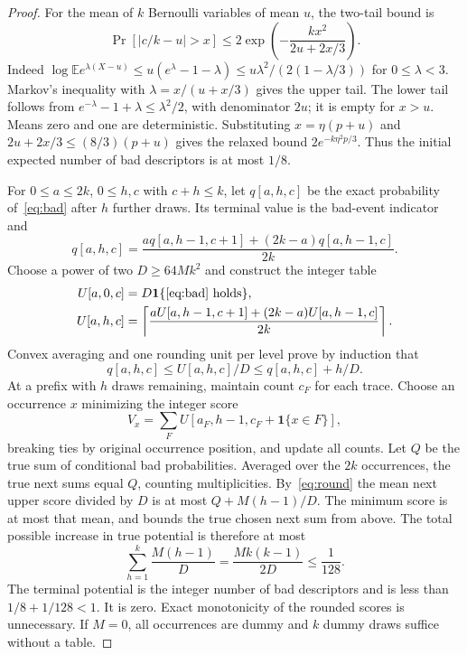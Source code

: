 \documentclass[acmsmall,11pt,nonacm,natbib=false]{acmart}
\newcommand{\ind}{\mathbf{1}}
\begin{document}
\begin{proof}
For the mean of $k$ Bernoulli variables of mean $u$, the two-tail bound is
\[
 \Pr[|c/k-u|>x]\leq2\exp\left(-\frac{kx^2}{2u+2x/3}\right).
\]
Indeed $\log\mathbb E e^{\lambda(X-u)}\leq
u(e^\lambda-1-\lambda)\leq u\lambda^2/(2(1-\lambda/3))$ for
$0\leq\lambda<3$. Markov's inequality with
$\lambda=x/(u+x/3)$ gives the upper tail. The lower tail follows from
$e^{-\lambda}-1+\lambda\leq\lambda^2/2$, with denominator $2u$;
it is empty for $x>u$. Means zero and one are deterministic. Substituting
$x=\eta(p+u)$ and $2u+2x/3\leq(8/3)(p+u)$ gives the relaxed bound
$2e^{-k\eta^2p/3}$. Thus the initial expected number of bad descriptors
is at most $1/8$.

For $0\leq a\leq2k$, $0\leq h,c$ with $c+h\leq k$, let $q[a,h,c]$
be the exact probability of~\eqref{eq:bad} after $h$ further draws.
Its terminal value is the bad-event indicator and
\[
 q[a,h,c]=\frac{a q[a,h-1,c+1]+(2k-a)q[a,h-1,c]}{2k}.
\]
Choose a power of two $D\geq64Mk^2$ and construct the integer table
\begin{align}
 U[a,0,c]&=D\ind\{\text{\eqref{eq:bad} holds}\},\nonumber\\
 U[a,h,c]&=\left\lceil
 \frac{aU[a,h-1,c+1]+(2k-a)U[a,h-1,c]}{2k}\right\rceil.\label{eq:table}
\end{align}
Convex averaging and one rounding unit per level prove by induction that
\begin{equation}\label{eq:round}
 q[a,h,c]\leq U[a,h,c]/D\leq q[a,h,c]+h/D.
\end{equation}
At a prefix with $h$ draws remaining, maintain count $c_F$ for each trace.
Choose an occurrence $x$ minimizing the integer score
\begin{equation}\label{eq:score}
 V_x=\sum_F U[a_F,h-1,c_F+\ind\{x\in F\}],
\end{equation}
breaking ties by original occurrence position, and update all counts.
Let $Q$ be the true sum of conditional bad probabilities. Averaged over
the $2k$ occurrences, the true next sums equal $Q$, counting multiplicities.
By~\eqref{eq:round} the mean next upper score divided by $D$ is at most
$Q+M(h-1)/D$. The minimum score is at most that mean, and bounds the true
chosen next sum from above. The total possible increase in true potential
is therefore at most
\[
 \sum_{h=1}^k\frac{M(h-1)}D
 =\frac{Mk(k-1)}{2D}\leq\frac1{128}.
\]
The terminal potential is the integer number of bad descriptors and is
less than $1/8+1/128<1$. It is zero. Exact monotonicity of the rounded
scores is unnecessary. If $M=0$, all occurrences are dummy and $k$ dummy
draws suffice without a table.


\end{proof}
\end{document}
